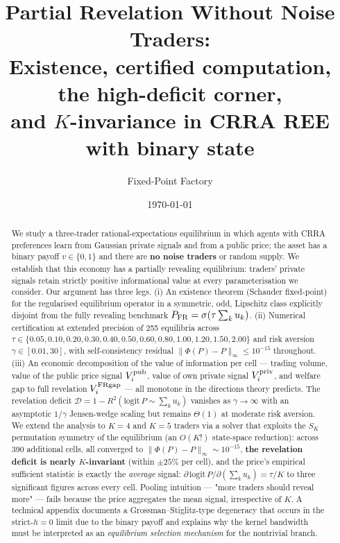 \documentclass[11pt]{article}
\title{Partial Revelation Without Noise Traders:\\
\large Existence, certified computation, the high-deficit corner,\\
and $K$-invariance in CRRA REE with binary state}
\author{Fixed-Point Factory}
\date{\today}
\newcommand{\1}{\mathbf{1}}
\newcommand{\deficit}{\mathcal{D}}
\newcommand{\Vipub}{V_{i}^{\rm pub}}
\newcommand{\Vipriv}{V_{i}^{\rm priv}}
\newcommand{\ViFR}{V_{i}^{\rm FRgap}}
\begin{document}
\maketitle

\begin{abstract}
We study a three-trader rational-expectations equilibrium in which agents
with CRRA preferences learn from Gaussian private signals and from a public
price; the asset has a binary payoff $v\in\{0,1\}$ and there are
\textbf{no noise traders} or random supply. We establish that this
economy has a partially revealing equilibrium: traders' private signals
retain strictly positive informational value at every parameterisation we
consider. Our argument has three legs. (i) An existence theorem
(Schauder fixed-point) for the regularised equilibrium operator in a
symmetric, odd, Lipschitz class explicitly disjoint from the fully
revealing benchmark $P_{\rm FR}=\sigma(\tau\sum_k u_k)$. (ii) Numerical
certification at extended precision of 255 equilibria across $\tau\in\{0.05,
0.10,0.20,0.30,0.40,0.50,0.60,0.80,1.00,1.20,1.50,2.00\}$ and risk aversion
$\gamma\in[0.01,30]$,
with self-consistency residual $\|\Phi(P)-P\|_\infty \le 10^{-15}$ throughout.
(iii) An economic decomposition of the value of information per cell ---
trading volume, value of the public price signal $\Vipub$, value of own
private signal $\Vipriv$, and welfare gap to full revelation $\ViFR$ ---
all monotone in the directions theory predicts. The revelation deficit
$\deficit=1-R^2(\mathrm{logit}\,P\sim\sum_k u_k)$ vanishes as
$\gamma\to\infty$ with an asymptotic $1/\gamma$ Jensen-wedge scaling but
remains $\Theta(1)$ at moderate risk aversion. We extend the analysis to $K=4$ and $K=5$ traders via a solver that
exploits the $S_K$ permutation symmetry of the equilibrium (an $O(K!)$
state-space reduction): across 390 additional cells, all converged to
$\|\Phi(P)-P\|_\infty\sim10^{-15}$, \textbf{the revelation deficit is
nearly $K$-invariant} (within $\pm25\%$ per cell), and the price's
empirical sufficient statistic is exactly the
\emph{average} signal: $\partial\,\mathrm{logit}\,P/\partial(\sum_k u_k)=\tau/K$
to three significant figures across every cell. Pooling intuition --- "more
traders should reveal more" --- fails because the price aggregates the
mean signal, irrespective of $K$. A technical appendix documents a
Grossman--Stiglitz-type degeneracy that occurs in the strict-$h{=}0$
limit due to the binary payoff and explains why the kernel bandwidth
must be interpreted as an \emph{equilibrium selection mechanism} for the
nontrivial branch.
\end{abstract}
\end{document}
